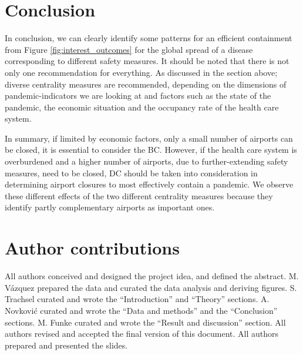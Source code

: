 \documentclass{Template_resources/netsci-project}
\begin{document}
\section{Conclusion}

In conclusion, we can clearly identify some patterns for an efficient containment from Figure \ref{fig:interest_outcomes} for the global spread of a disease corresponding to different safety measures.
It should be noted that there is not only one recommendation for everything. As discussed in the section above; diverse centrality measures are recommended, depending on the dimensions of pandemic-indicators we are looking at and factors such as the state of the pandemic, the economic situation and the occupancy rate of the health care system. 

In summary, if limited by economic factors, only a small number of airports can be closed, it is essential to consider the BC. However, if the health care system is overburdened and a higher number of airports, due to further-extending safety measures, need to be closed, DC should be taken into consideration in determining airport closures to most effectively contain a pandemic. We observe these different effects of the two different centrality measures because they identify partly complementary airports as important ones. 


%


\clearpage
\printbibliography


\section*{Author contributions}
All authors conceived and designed the project idea, and defined the abstract. M. Vázquez prepared the data and curated the data analysis and deriving figures. S. Trachsel curated and wrote the ``Introduction'' and ``Theory'' sections. A. Novković curated and wrote the ``Data and methods'' and the ``Conclusion'' sections. M. Funke curated and wrote the ``Result and discussion'' section. All authors revised and accepted the final version of this document. All authors prepared and presented the slides.
\end{document}
